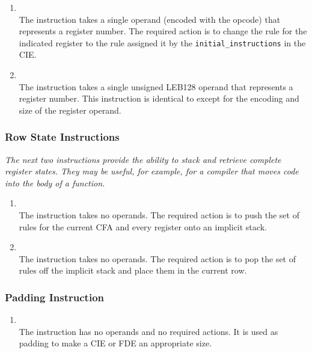\begin{enumerate}[1. ]
\item \textbf{\DWCFArestoreTARG} \\
The \DWCFArestoreNAME{} instruction takes a single operand (encoded
with the opcode) that represents a register number. The
required action is to change the rule for the indicated
register to the rule assigned it by the \texttt{initial\_instructions}
in the CIE.

\item \textbf{\DWCFArestoreextendedTARG} \\
The \DWCFArestoreextendedNAME{}
instruction takes a single unsigned LEB128 
operand that represents a register number. This
instruction is identical to \DWCFArestore{} except for the
encoding and size of the register operand.

\end{enumerate}

\subsubsection{Row State Instructions}
\label{chap:rowstateinstructions}

\textit{The next two instructions provide the ability to stack and
retrieve complete register states. They may be useful, for
example, for a compiler that moves  code 
into the
body of a function.}


\begin{enumerate}[1. ]

\item \textbf{\DWCFArememberstateTARG} \\
The \DWCFArememberstateNAME{} instruction takes no operands. The
required action is to push the set of rules for 
\bb
the current CFA and
\eb
every register onto an implicit stack.

\item \textbf{\DWCFArestorestateTARG} \\
The \DWCFArestorestateNAME{} instruction takes no operands. The
required action is to pop the set of rules off the implicit
stack and place them in the current row.

\end{enumerate}

\subsubsection{Padding Instruction}
\label{chap:paddinginstruction}
\begin{enumerate}[1. ]
\item \textbf{\DWCFAnopTARG} \\
The \DWCFAnopNAME{} instruction has no operands and no required
actions. It is used as padding to make a CIE or FDE an
appropriate size.

\end{enumerate}

